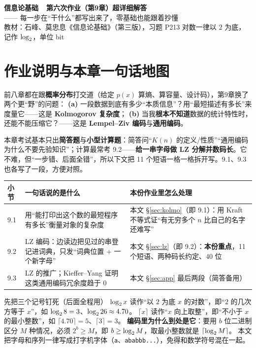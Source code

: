 \documentclass[11pt,a4paper]{ctexart}
\begin{document}
\begin{center}
{\LARGE\bfseries 信息论基础\ \ 第六次作业（第9章）超详细解答}\\[6pt]
{\large —— 每一步在“干什么”都写出来了，零基础也能跟着抄懂}\\[6pt]
{\small 教材：石峰、莫忠息《信息论基础》（第三版），习题 P213\quad
对数一律以 $2$ 为底，记作 $\log_{2}$，单位 bit}
\end{center}

\section{作业说明与本章一句话地图}

前八章都在跟\textbf{概率分布}打交道（给定 $p(x)$ 算熵、算容量、设计码），第9章换了两个更“野”的问题：
\textbf{(a)} 一段数据到底有多少“本质信息”？用“最短描述有多长”来度量它——这是 \textbf{Kolmogorov 复杂度}；
\textbf{(b)} 当我\textbf{根本不知道}数据的统计特性时，还能不能压缩它？——这是 \textbf{Lempel--Ziv 编码}与\textbf{通用编码}。

本章考试基本只出\textbf{简答题}与\textbf{小型计算题}：简答问“$K(n)$ 的定义/性质”“通用编码为什么不要先验知识”；计算最常考 9.2——\textbf{给一串字母做 LZ 分解并数码长}。它不难，但“一步错、后面全错”，所以下文把 11 个短语一格一格拆开写。9.1、9.3 也各写了一段，方便对照。

\begin{center}
\small
\begin{tabular}{@{}p{1.2cm}p{6.4cm}p{7.6cm}@{}}
\toprule
小节 & 一句话说的是什么 & 本份作业里怎么处理 \\
\midrule
9.1 & 用“能打印出这个数的最短程序有多长”衡量对象的复杂度 & 本文 \S\ref{sec:kolmo}（即 9.1）：用 Kraft 不等式证“有无穷多个 $n$ 比自己的名字还难写” \\
9.2 & LZ 编码：边读边把见过的串登记进词典，只发“词典位置 + 一个新字母” & 本文 \S\ref{sec:lz}（即 9.2）：\textbf{本份重点}，11 个短语、两种码长约定、$40$ 位 \\
9.3 & LZ 的推广；Kieffer--Yang 证明这类通用编码冗余度趋于 $0$ & 本文 \S\ref{sec:app} 最后两段（简答备用） \\
\bottomrule
\end{tabular}
\end{center}

\begin{qa}{先把三个记号钉死（后面全程用）}
$\log_{2} x$ 读作“以 $2$ 为底 $x$ 的对数”，即“$2$ 的几次方等于 $x$”，如 $\log_{2} 8=3$、$\log_{2} 26\approx4.70$。
$\lceil x\rceil$ 读作“$x$ 向上取整”，即“不小于 $x$ 的最小整数”，如 $\lceil 4.70\rceil=5$、$\lceil 3\rceil=3$。
\textbf{编码里为什么到处是它}：要用 $b$ 位二进制区分 $M$ 种情况，必须 $2^{b}\ge M$，即 $b\ge\log_{2} M$，取最小整数就是 $\lceil\log_{2} M\rceil$。
本文把字母和序列一律写成打字机字体（\texttt{a}、\texttt{ababbb...}），免得和数学符号混在一起。
\end{qa}
\end{document}
